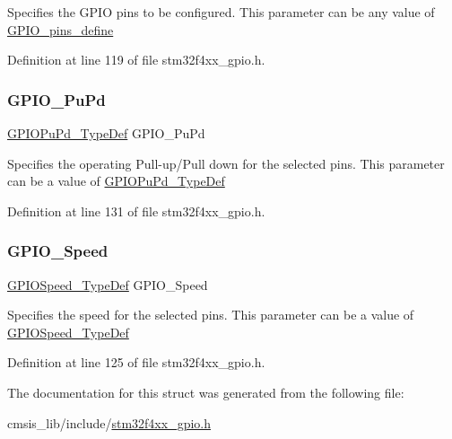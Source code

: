 Specifies the G\+P\+IO pins to be configured. This parameter can be any value of \hyperlink{group___g_p_i_o__pins__define}{G\+P\+I\+O\+\_\+pins\+\_\+define} 

Definition at line 119 of file stm32f4xx\+\_\+gpio.\+h.

\mbox{\label{struct_g_p_i_o___init_type_def_aeb0168ffc465346d21f3120aec320b72}} 
\subsubsection{\texorpdfstring{G\+P\+I\+O\+\_\+\+Pu\+Pd}{GPIO\_PuPd}}
{\footnotesize\ttfamily \hyperlink{group___g_p_i_o_gafb7ecd99c44b4fd702d669304a36c2c8}{G\+P\+I\+O\+Pu\+Pd\+\_\+\+Type\+Def} G\+P\+I\+O\+\_\+\+Pu\+Pd}

Specifies the operating Pull-\/up/\+Pull down for the selected pins. This parameter can be a value of \hyperlink{group___g_p_i_o_gafb7ecd99c44b4fd702d669304a36c2c8}{G\+P\+I\+O\+Pu\+Pd\+\_\+\+Type\+Def} 

Definition at line 131 of file stm32f4xx\+\_\+gpio.\+h.

\mbox{\label{struct_g_p_i_o___init_type_def_a57b08335216f50618ebc080e4fbb0a80}} 
\subsubsection{\texorpdfstring{G\+P\+I\+O\+\_\+\+Speed}{GPIO\_Speed}}
{\footnotesize\ttfamily \hyperlink{group___g_p_i_o_ga062ad92b67b4a1f301c161022cf3ba8e}{G\+P\+I\+O\+Speed\+\_\+\+Type\+Def} G\+P\+I\+O\+\_\+\+Speed}

Specifies the speed for the selected pins. This parameter can be a value of \hyperlink{group___g_p_i_o_ga062ad92b67b4a1f301c161022cf3ba8e}{G\+P\+I\+O\+Speed\+\_\+\+Type\+Def} 

Definition at line 125 of file stm32f4xx\+\_\+gpio.\+h.



The documentation for this struct was generated from the following file\+:\begin{DoxyCompactItemize}
\item 
cmsis\+\_\+lib/include/\hyperlink{stm32f4xx__gpio_8h}{stm32f4xx\+\_\+gpio.\+h}\end{DoxyCompactItemize}
